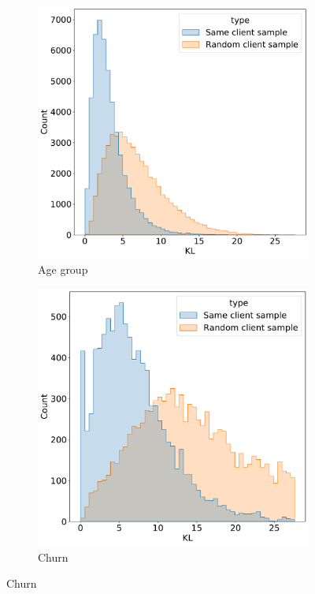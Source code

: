 \documentclass{article}
\begin{document}
\begin{figure}
  \centering
  \begin{subfigure}{0.5\linewidth}
    \caption{Age group}
    \includegraphics[width=\linewidth]{figures/kl_dis_age_group.pdf}
  \end{subfigure}%
  \begin{subfigure}{0.5\linewidth}
    \caption{Churn}
    \includegraphics[width=\linewidth]{figures/kl_dis_churn.pdf}

\end{subfigure}
\end{figure}
\end{document}
